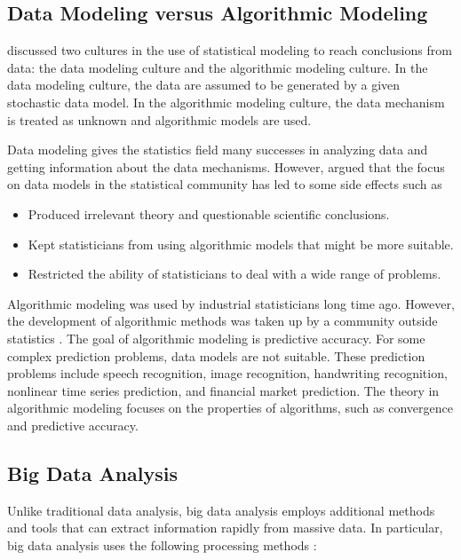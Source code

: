 \documentclass[]{book}
\theoremstyle{definition}
\theoremstyle{definition}
\theoremstyle{definition}
\theoremstyle{remark}
\begin{document}
\subsection{Data Modeling versus Algorithmic
Modeling}\label{data-modeling-versus-algorithmic-modeling}

\citet{breiman2001modeling} discussed two cultures in the use of
statistical modeling to reach conclusions from data: the data modeling
culture and the algorithmic modeling culture. In the data modeling
culture, the data are assumed to be generated by a given stochastic data
model. In the algorithmic modeling culture, the data mechanism is
treated as unknown and algorithmic models are used.

Data modeling gives the statistics field many successes in analyzing
data and getting information about the data mechanisms. However,
\citet{breiman2001modeling} argued that the focus on data models in the
statistical community has led to some side effects such as

\begin{itemize}
\item
  Produced irrelevant theory and questionable scientific conclusions.
\item
  Kept statisticians from using algorithmic models that might be more
  suitable.
\item
  Restricted the ability of statisticians to deal with a wide range of
  problems.
\end{itemize}

Algorithmic modeling was used by industrial statisticians long time ago.
However, the development of algorithmic methods was taken up by a
community outside statistics \citep{breiman2001modeling}. The goal of
algorithmic modeling is predictive accuracy. For some complex prediction
problems, data models are not suitable. These prediction problems
include speech recognition, image recognition, handwriting recognition,
nonlinear time series prediction, and financial market prediction. The
theory in algorithmic modeling focuses on the properties of algorithms,
such as convergence and predictive accuracy.

\subsection{Big Data Analysis}\label{big-data-analysis}

Unlike traditional data analysis, big data analysis employs additional
methods and tools that can extract information rapidly from massive
data. In particular, big data analysis uses the following processing
methods \citep{chen2014b}:
\end{document}
